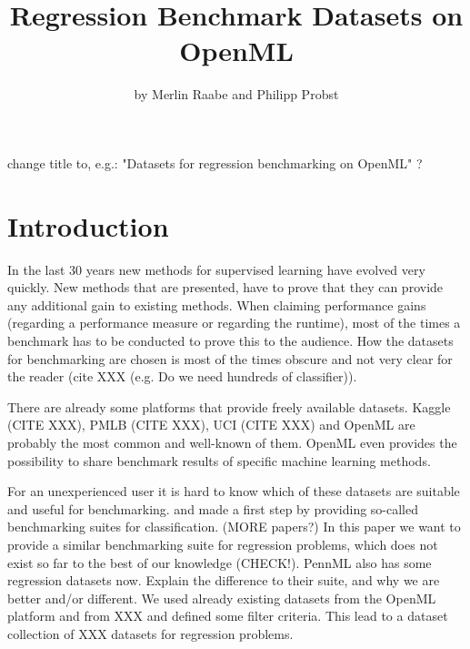 \documentclass[a4paper]{article}
\begin{document}
\title{Regression Benchmark Datasets on OpenML}

\author{by Merlin Raabe and Philipp Probst}

\maketitle
{}

\color{red} change title to, e.g.: "Datasets for regression benchmarking on OpenML" ? \color{black}

\section{Introduction}
In the last 30 years new methods for supervised learning have evolved very quickly. 
New methods that are presented, have to prove that they can provide any additional gain to existing methods.
When claiming performance gains (regarding a performance measure or regarding the runtime), most of the times a benchmark has to be conducted to prove this to the audience. 
How the datasets for benchmarking are chosen is most of the times obscure and not very clear for the reader (cite XXX (e.g. Do we need hundreds of classifier)). 

There are already some platforms that provide freely available datasets. 
Kaggle (CITE XXX), PMLB (CITE XXX), UCI (CITE XXX) and OpenML \citep{OpenML2013} are probably the most common and well-known of them. 
OpenML even provides the possibility to share benchmark results of specific machine learning methods. 

For an unexperienced user it is hard to know which of these datasets are suitable and useful for benchmarking. 
\citet{Bischl2017} and \citet{Olson2017} made a first step by providing so-called benchmarking suites for classification. 
(MORE papers?)
In this paper we want to provide a similar benchmarking suite for regression problems, which does not exist so far to the best of our knowledge (CHECK!). \color{red} PennML also has some regression datasets now. Explain the difference to their suite, and why we are better and/or different. \color{black} We used already existing datasets from the OpenML platform and from XXX and defined some filter criteria. 
This lead to a dataset collection of XXX datasets for regression problems.
\end{document}
